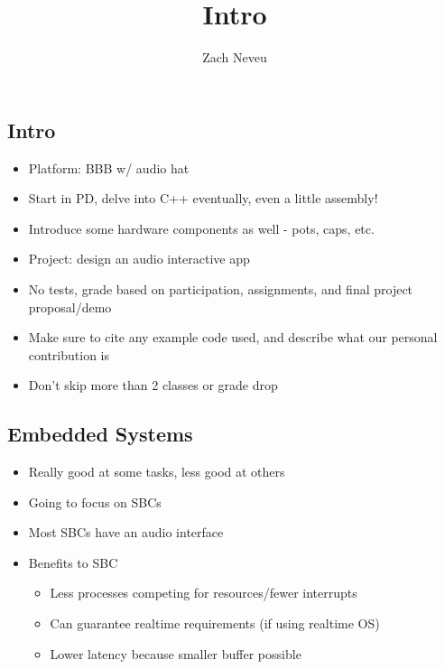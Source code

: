 \documentclass[12pt, letter]{article}
\author{Zach Neveu}
\title{ Intro }
\begin{document}
\maketitle
\subsection*{Intro}
\begin{itemize}
	\item Platform: \ac{BBB} w/ audio hat
	\item Start in PD, delve into C++ eventually, even a little assembly!
	\item Introduce some hardware components as well - pots, caps, etc.
	\item Project: design an audio interactive app
	\item No tests, grade based on participation, assignments, and final project proposal/demo
	\item Make sure to cite any example code used, and describe what our personal contribution is
	\item Don't skip more than 2 classes or grade drop
\end{itemize}

\subsection*{Embedded Systems}
\begin{itemize}
	\item Really good at some tasks, less good at others
	\item Going to focus on \acp{SBC}
	\item Most \acp{SBC} have an audio interface
	\item Benefits to \ac{SBC}
	\begin{itemize}
		\item Less processes competing for resources/fewer interrupts
		\item Can guarantee realtime requirements (if using realtime OS)
		\item Lower latency because smaller buffer possible
	\end{itemize}
\end{itemize}
\end{document}
